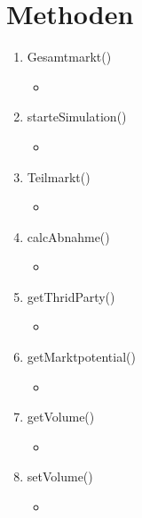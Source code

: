 \section{Methoden}
\begin{enumerate}
	\item Gesamtmarkt() 
	\begin{itemize}
	\item	
	\end{itemize}
	\item starteSimulation() 
	\begin{itemize}
	\item 	
	\end{itemize}
	\item Teilmarkt()
	\begin{itemize}
	\item 	
	\end{itemize}
	\item calcAbnahme() 
	\begin{itemize}
	\item 	
	\end{itemize}
	\item getThridParty() 
	\begin{itemize}
	\item 	
	\end{itemize}
	\item getMarktpotential() 
	\begin{itemize}
	\item 	
	\end{itemize}
	\item getVolume() 
	\begin{itemize}
	\item 	
	\end{itemize}
	\item setVolume() 
	\begin{itemize}
	\item 	
	\end{itemize}
\end{enumerate}